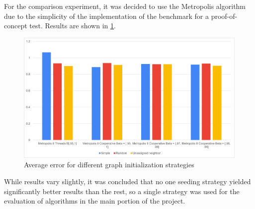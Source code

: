 \documentclass[runningheads]{llncs}
\begin{document}
For the comparison experiment, it was decided to use the Metropolis algorithm due to the simplicity of the implementation of the benchmark for a proof-of-concept test. Results are shown in \ref{fig:seeding}.


\begin{figure}[!h]
  \centering
  \includegraphics[width=1\textwidth]{Seeding_error.png}
  \caption{Average error for different graph initialization strategies}
  \label{fig:seeding}
\end{figure}

While results vary slightly, it was concluded that no one seeding strategy yielded significantly better results than the rest, so a single strategy was used for the evaluation of algorithms in the main portion of the project.


\clearpage

\printbibliography
\end{document}
